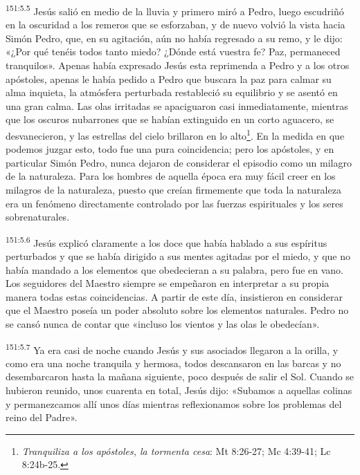 \par 
\textsuperscript{151:5.5} Jesús salió en medio de la lluvia y primero miró a Pedro, luego escudriñó en la oscuridad a los remeros que se esforzaban, y de nuevo volvió la vista hacia Simón Pedro, que, en su agitación, aún no había regresado a su remo, y le dijo: «¿Por qué tenéis todos tanto miedo? ¿Dónde está vuestra fe? Paz, permaneced tranquilos». Apenas había expresado Jesús esta reprimenda a Pedro y a los otros apóstoles, apenas le había pedido a Pedro que buscara la paz para calmar su alma inquieta, la atmósfera perturbada restableció su equilibrio y se asentó en una gran calma. Las olas irritadas se apaciguaron casi inmediatamente, mientras que los oscuros nubarrones que se habían extinguido en un corto aguacero, se desvanecieron, y las estrellas del cielo brillaron en lo alto\footnote{\textit{Tranquiliza a los apóstoles, la tormenta cesa}: Mt 8:26-27; Mc 4:39-41; Lc 8:24b-25.}. En la medida en que podemos juzgar esto, todo fue una pura coincidencia; pero los apóstoles, y en particular Simón Pedro, nunca dejaron de considerar el episodio como un milagro de la naturaleza. Para los hombres de aquella época era muy fácil creer en los milagros de la naturaleza, puesto que creían firmemente que toda la naturaleza era un fenómeno directamente controlado por las fuerzas espirituales y los seres sobrenaturales.

\par 
\textsuperscript{151:5.6} Jesús explicó claramente a los doce que había hablado a sus espíritus perturbados y que se había dirigido a sus mentes agitadas por el miedo, y que no había mandado a los elementos que obedecieran a su palabra, pero fue en vano. Los seguidores del Maestro siempre se empeñaron en interpretar a su propia manera todas estas coincidencias. A partir de este día, insistieron en considerar que el Maestro poseía un poder absoluto sobre los elementos naturales. Pedro no se cansó nunca de contar que «incluso los vientos y las olas le obedecían».

\par 
\textsuperscript{151:5.7} Ya era casi de noche cuando Jesús y sus asociados llegaron a la orilla, y como era una noche tranquila y hermosa, todos descansaron en las barcas y no desembarcaron hasta la mañana siguiente, poco después de salir el Sol. Cuando se hubieron reunido, unos cuarenta en total, Jesús dijo: «Subamos a aquellas colinas y permanezcamos allí unos días mientras reflexionamos sobre los problemas del reino del Padre».

